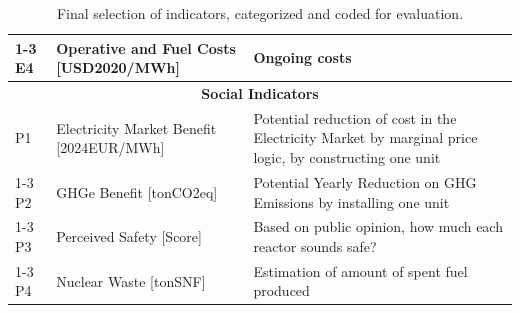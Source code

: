 \begin{table}[!hb]
\begin{tabularx}{\textwidth}{lXX}
        \cmidrule(lr){1-3}
        E4 & Operative and Fuel Costs [USD2020/MWh] & Ongoing costs \\
        \midrule
        \multicolumn{3}{c}{\textbf{Social Indicators}} \\
        \midrule
        P1 & Electricity Market Benefit [2024EUR/MWh] & Potential reduction of cost in the Electricity Market by marginal price logic, by constructing one unit \\
        \cmidrule(lr){1-3}
        P2 & GHGe Benefit [tonCO2eq] & Potential Yearly Reduction on GHG Emissions by installing one unit \\
        \cmidrule(lr){1-3}
        P3 & Perceived Safety [Score] & Based on public opinion, how much each reactor sounds safe? \\
        \cmidrule(lr){1-3}
        P4 & Nuclear Waste [tonSNF] & Estimation of amount of spent fuel produced \\
        \bottomrule
    \end{tabularx}
    \caption{Final selection of indicators, categorized and coded for evaluation.}
    \label{tab:final_indicators}
\end{table}
